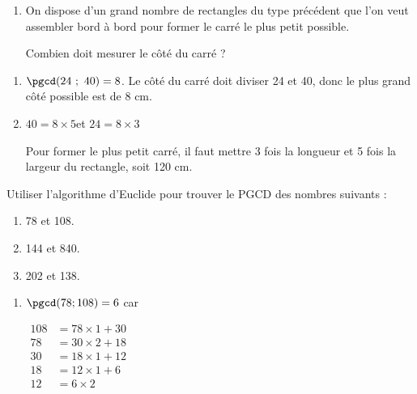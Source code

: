\begin{colonne*exercice}
\begin{exercice*}
\begin{enumerate}
Combien doit mesurer le côté du carré ?

\item On dispose d’un grand nombre de rectangles du type précédent que
  l’on veut assembler bord à bord pour former le carré le plus petit possible.

Combien doit mesurer le côté du carré ?
\end{enumerate}
\end{exercice*}
\begin{corrige}
  \begin{enumerate}
  \item$\pgcd(24\ ;\ 40)=8$. Le côté du carré doit diviser 24 et 40, donc
    le plus grand côté possible est de 8 cm.

  \item $40=8\times5$\enskip et \enskip $24=8\times3$

  Pour former le plus petit carré, il faut mettre 3 fois la longueur
  et 5 fois la largeur du rectangle, soit 120 cm.
\end{enumerate}
\end{corrige}

\begin{exercice*}
  Utiliser l’algorithme d’Euclide pour trouver le PGCD des nombres
  suivants :

\vspace{-2mm}
\begin{multicols}{2}
\begin{enumerate}
\item 78 et 108.
\item 144 et 840.
\item 202 et 138.
\end{enumerate}
\end{multicols}
\end{exercice*}
\begin{corrige}
  \begin{enumerate}
  \item $\pgcd(78;108)=6$ car

    $\begin{aligned}
      108&=78\times1+30\\
      78&=30\times2+18\\
      30&=18\times1+12\\
      18&=12\times1+6\\
      12&=6\times2\end{aligned}$\medskip
    

\end{enumerate}
\end{corrige}
\end{colonne*exercice}
